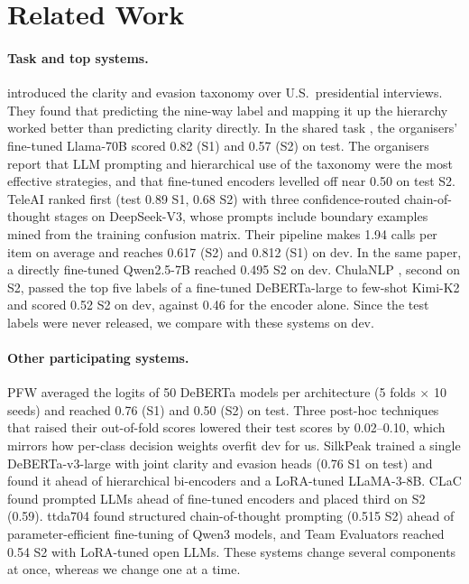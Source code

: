 \section{Related Work}\label{sec:related}

\paragraph{Task and top systems.}
\citet{thomas-etal-2024-never} introduced the clarity and evasion taxonomy over U.S.\ presidential interviews.
They found that predicting the nine-way label and mapping it up the hierarchy worked better than predicting clarity directly.
In the shared task \citep{thomas-etal-2026-semeval}, the organisers' fine-tuned Llama-70B scored 0.82 (S1) and 0.57 (S2) on test.
The organisers report that LLM prompting and hierarchical use of the taxonomy were the most effective strategies, and that fine-tuned encoders levelled off near 0.50 on test S2.
TeleAI \citep{shi-etal-2026-teleai} ranked first (test 0.89 S1, 0.68 S2) with three confidence-routed chain-of-thought stages on DeepSeek-V3, whose prompts include boundary examples mined from the training confusion matrix.
Their pipeline makes 1.94 calls per item on average and reaches 0.617 (S2) and 0.812 (S1) on dev.
In the same paper, a directly fine-tuned Qwen2.5-7B reached 0.495 S2 on dev.
ChulaNLP \citep{peerachaidecho-rutherford-2026-chulanlp}, second on S2, passed the top five labels of a fine-tuned DeBERTa-large to few-shot Kimi-K2 and scored 0.52 S2 on dev, against 0.46 for the encoder alone.
Since the test labels were never released, we compare with these systems on dev.

\paragraph{Other participating systems.}
PFW \citep{tamsal-rusert-2026-pfw} averaged the logits of 50 DeBERTa models per architecture (5 folds $\times$ 10 seeds) and reached 0.76 (S1) and 0.50 (S2) on test.
Three post-hoc techniques that raised their out-of-fold scores lowered their test scores by 0.02--0.10, which mirrors how per-class decision weights overfit dev for us.
SilkPeak \citep{tetakali-tetakali-2026-silkpeak} trained a single DeBERTa-v3-large with joint clarity and evasion heads (0.76 S1 on test) and found it ahead of hierarchical bi-encoders and a LoRA-tuned LLaMA-3-8B.
CLaC \citep{turk-etal-2026-clac} found prompted LLMs ahead of fine-tuned encoders and placed third on S2 (0.59).
ttda704 \citep{tran-tan-dinh-2026-ttda704} found structured chain-of-thought prompting (0.515 S2) ahead of parameter-efficient fine-tuning of Qwen3 models, and Team Evaluators \citep{nuthakki-etal-2026-team} reached 0.54 S2 with LoRA-tuned open LLMs.
These systems change several components at once, whereas we change one at a time.

